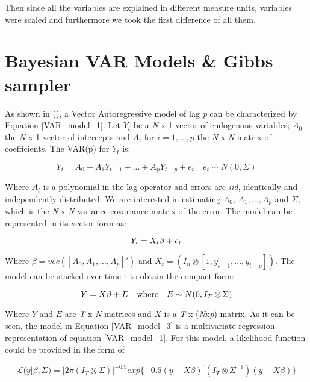 \documentclass[12pt]{article}
\begin{document}
Then since all the variables are explained in different measure units, variables were scaled and furthermore we took the first difference of all them.


\section{Bayesian VAR Models \& Gibbs sampler} \label{Bayesian VAR Models}

As shown in (\cite{canova2013panel}), a Vector Autoregressive model of lag \emph{p} can be characterized by Equation \ref{VAR_model_1}. Let $Y_{t}$ be a \emph{N} x 1 vector of endogenous variables; $A_{0}$ the \emph{N} x 1 vector of intercepts and $A_{i}$ for $i = 1, ..., p$ the \emph{N} x \emph{N} matrix of coefficients. The VAR(p) for $Y_{t}$ is:

\begin{equation}\label{VAR_model_1}
Y_{t} = A_{0} + A_{1}Y_{t-1} + ... + A_{p}Y_{t-p} + e_{t}  \quad e_{t} \sim N(0, \Sigma)
\end{equation}

Where $A_{l}$ is a polynomial in the lag operator and errors are \emph{iid}, identically and independently distributed.  We are interested in estimating $A_{0}$, $A_{1}, ..., A_{p}$ and $\Sigma$, which is the \emph{N} x \emph{N} variance-covariance matrix of the error. The model can be represented in its vector form as: 

\begin{equation}\label{VAR_model_2}
Y_{t} = X_{t}\beta + e_{t} \\[1pt]
\end{equation}

Where $\beta = vec([A_{0}, A_{1}, ..., A_{p}]')$ and $X_{t} = (I_{n} \otimes [1, y_{t-1}^{'}, ..., y_{t-p}^{'}])$. The model can be stacked over time t to obtain the compact form:

\begin{equation}\label{VAR_model_3}
Y = X\beta + E \\[1pt] \quad \text{where} \quad E \sim N(0, I_{T} \otimes \Sigma)
\end{equation}

Where $Y$ and $E$ are \emph{T} x \emph{N} matrices and $X$ is a \emph{T} x (\emph{N}x\emph{p}) matrix. As it can be seen, the model in Equation \ref{VAR_model_3} is a multivariate regression representation of equation \ref{VAR_model_1}. For this model, a likelihood function could be provided in the form of

\begin{equation}\label{Likelihood_1}
\mathcal{L}(y | \beta, \Sigma) = |2\pi (I_{T} \otimes \Sigma)|^{-0.5} exp\{-0.5(y-X\beta)^{'}(I_{T} \otimes \Sigma^{-1})(y-X\beta)\}
\end{equation}
\end{document}
